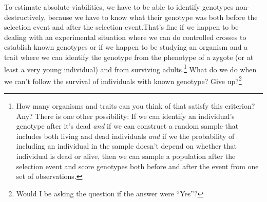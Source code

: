To estimate absolute viabilities, we have to be able to identify
genotypes non-destructively, because we have to know what their
genotype was both before the selection event and after the selection
event.That's fine if we happen to be dealing with an experimental
situation where we can do controlled crosses to establish known
genotypes or if we happen to be studying an organism and a trait where
we can identify the genotype from the phenotype of a zygote (or at
least a very young individual) and from surviving adults.\footnote{How
  many organisms and traits can you think of that satisfy this
  criterion? Any? There is one other possibility: If we can identify
  an individual's genotype after it's dead {\it and\/} if we can
  construct a random sample that includes both living and dead
  individuals {\it and\/} if we the probability of including an
  individual in the sample doesn't depend on whether that individual
  is dead or alive, then we can sample a population after the
  selection event and score genotypes both before and after the event
  from one set of observations.} What do we do when we can't follow
the survival of individuals with known genotype? Give
up?\footnote{Would I be asking the question if the answer were
  ``Yes''?}

